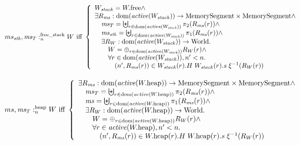 \documentclass[a4paper]{article}
\begin{document}
{\[
  \memSatFStack{ms_\stk,\ms_T}{W} \text{ iff } 
  \left\{
    \begin{array}{l}
      W_\var{stack} = \pwfree \wedge \\
      \exists R_\ms : \dom(\activeReg{W_\var{stack}}) \fun \MemSeg \times \MemSeg \wedge \\
      \quad \ms_T = \biguplus_{r \in \dom(\activeReg{W_\var{stack}})} \pi_2(R_\ms(r)) \wedge \\
      \quad \ms_\stk = \biguplus_{r \in \dom(\activeReg{W_\var{stack}})} \pi_1(R_\ms(r)) \wedge \\
      \quad \exists R_W : \dom(\activeReg{W_\var{stack}}) \fun \World\ldotp\\
      \qquad W = \oplus_{r \in \dom(\activeReg{W_\var{stack}})} R_W(r) \wedge\\
      \qquad \forall r \in \dom(\activeReg{W_\var{stack}}), n' < n \ldotp \\
      \qquad \quad \npair[n']{R_\ms(r)} \in  W_\var{stack}(r).H \; W_\var{stack}(r).s \; \xi^{-1}(R_W(r))
    \end{array}
  \right.
\]

\[
  \memSatHeap{ms,\ms_T}{W} \text{ iff } 
  \left\{
    \begin{array}{l}
      \exists R_\ms : \dom(\activeReg{\pwheap}) \fun \MemSeg \times \MemSeg \wedge \\
      \quad \ms_T = \biguplus_{r \in \dom(\activeReg{\pwheap})} \pi_2(R_\ms(r)) \wedge \\
      \quad \ms = \biguplus_{r \in \dom(\activeReg{\pwheap})} \pi_1(R_\ms(r)) \wedge \\
      \quad \exists R_W : \dom(\activeReg{\pwheap}) \fun \World\ldotp\\
      \qquad W = \oplus_{r \in \dom(\activeReg{\pwheap})} R_W(r) \wedge\\
      \qquad \forall r \in \activeReg{\pwheap}, n' < n \ldotp \\
      \qquad \quad \npair[n']{R_\ms(r)} \in  \pwheap(r).H \; \pwheap(r).s \; \xi^{-1}(R_W(r))
    \end{array}
  \right.
\]
}
\end{document}
